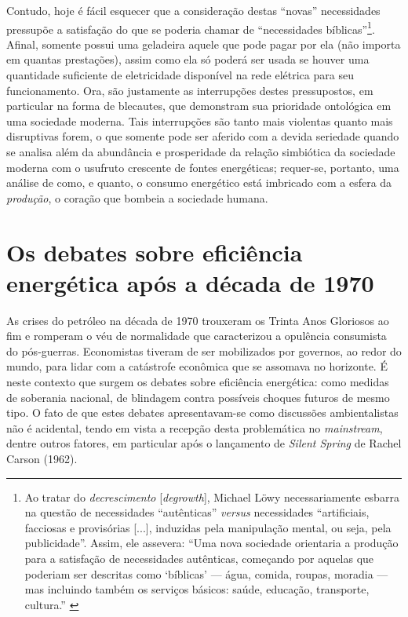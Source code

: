 Contudo, hoje é fácil esquecer que a consideração destas ``novas'' necessidades pressupõe a satisfação do que se poderia chamar de ``necessidades bíblicas''\footnote{Ao tratar do \textit{decrescimento} [\textit{degrowth}], Michael Löwy necessariamente esbarra na questão de necessidades ``autênticas'' \textit{versus} necessidades ``artificiais, facciosas e provisórias [...], induzidas pela manipulação mental, ou seja, pela publicidade''. Assim, ele assevera: ``Uma nova sociedade orientaria a produção para a satisfação de necessidades autênticas, começando por aquelas que poderiam ser descritas como `bíblicas' --- água, comida, roupas, moradia --- mas incluindo também os serviços básicos: saúde, educação, transporte, cultura.'' \parencite{Lowy2023}}. Afinal, somente possui uma geladeira aquele que pode pagar por ela (não importa em quantas prestações), assim como ela só poderá ser usada se houver uma quantidade suficiente de eletricidade disponível na rede elétrica para seu funcionamento. Ora, são justamente as interrupções destes pressupostos, em particular na forma de blecautes, que demonstram sua prioridade ontológica em uma sociedade moderna. Tais interrupções são tanto mais violentas quanto mais disruptivas forem, o que somente pode ser aferido com a devida seriedade quando se analisa além da abundância e prosperidade da relação simbiótica da sociedade moderna com o usufruto crescente de fontes energéticas; requer-se, portanto, uma análise de como, e quanto, o consumo energético está imbricado com a esfera da \textit{produção}, o coração que bombeia a sociedade humana.

\section{Os debates sobre eficiência energética após a década de 1970}
As crises do petróleo na década de 1970 trouxeram os Trinta Anos Gloriosos ao fim e romperam o véu de normalidade que caracterizou a opulência consumista do pós-guerras. Economistas tiveram de ser mobilizados por governos, ao redor do mundo, para lidar com a catástrofe econômica que se assomava no horizonte. É neste contexto que surgem os debates sobre eficiência energética: como medidas de soberania nacional, de blindagem contra possíveis choques futuros de mesmo tipo. O fato de que estes debates apresentavam-se como discussões ambientalistas não é acidental, tendo em vista a recepção desta problemática no \textit{mainstream}, dentre outros fatores, em particular após o lançamento de \textit{Silent Spring} de Rachel Carson (1962). 

